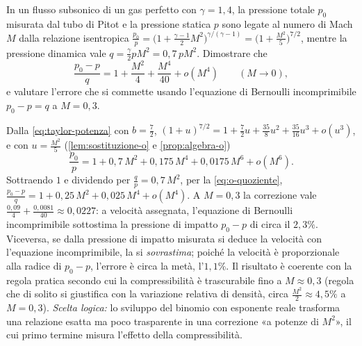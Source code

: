 \begin{esercizio}
\label{es:compressibilita}
In un flusso subsonico di un gas perfetto con $\gamma=1{,}4$, la pressione totale $p_{0}$
misurata dal tubo di Pitot e la pressione statica $p$ sono legate al numero di Mach $M$
dalla relazione isentropica $\frac{p_{0}}p=\bigl(1+\frac{\gamma-1}2M^{2}\bigr)^{\gamma/(\gamma-1)}=\bigl(1+\frac{M^{2}}5\bigr)^{7/2}$,
mentre la pressione dinamica vale $q=\frac\gamma2pM^{2}=0{,}7\,pM^{2}$. Dimostrare che
\[
  \frac{p_{0}-p}{q}=1+\frac{M^{2}}4+\frac{M^{4}}{40}+o(M^{4}) \qquad (M\to0) ,
\]
e valutare l'errore che si commette usando l'equazione di Bernoulli incomprimibile
$p_{0}-p=q$ a $M=0{,}3$.
\begin{soluzione}
Dalla \eqref{eq:taylor-potenza} con $b=\frac72$,
$(1+u)^{7/2}=1+\frac72u+\frac{35}8u^{2}+\frac{35}{16}u^{3}+o(u^{3})$, e con $u=\frac{M^{2}}5$
(\cref{lem:sostituzione-o} e \cref{prop:algebra-o})
\[
  \frac{p_{0}}p=1+0{,}7\,M^{2}+0{,}175\,M^{4}+0{,}0175\,M^{6}+o(M^{6}) .
\]
Sottraendo $1$ e dividendo per $\frac qp=0{,}7\,M^{2}$, per la \eqref{eq:o-quoziente},
$\frac{p_{0}-p}q=1+0{,}25\,M^{2}+0{,}025\,M^{4}+o(M^{4})$. A $M=0{,}3$ la correzione vale
$\frac{0{,}09}4+\frac{0{,}0081}{40}\approx0{,}0227$: a velocità assegnata, l'equazione di Bernoulli
incomprimibile sottostima la pressione di impatto $p_{0}-p$ di circa il $2{,}3\%$.
Viceversa, se dalla pressione di impatto misurata si deduce la velocità con l'equazione
incomprimibile, la si \emph{sovrastima}; poiché la velocità è proporzionale alla radice
di $p_{0}-p$, l'errore è circa la metà, l'$1{,}1\%$.
Il risultato è coerente con la regola pratica secondo cui la compressibilità è
trascurabile fino a $M\approx0{,}3$ (regola che di solito si giustifica con la variazione
relativa di densità, circa $\frac{M^{2}}2\approx4{,}5\%$ a $M=0{,}3$).
\emph{Scelta logica:} lo sviluppo del binomio con esponente reale trasforma
una relazione esatta ma poco trasparente in una correzione «a potenze di $M^{2}$», il cui
primo termine misura l'effetto della compressibilità.
\end{soluzione}
\end{esercizio}

